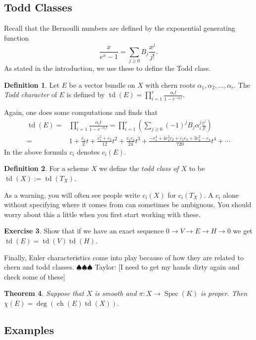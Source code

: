 \documentclass[12pt]{article}
\numberwithin{equation}{section}
\newtheorem{theorem}{Theorem}[subsection]
\theoremstyle{definition}
\newtheorem{definition}[theorem]{Definition}
\newtheorem{exercise}[theorem]{Exercise}
\theoremstyle{remark}
\newcommand{\Spec}{\operatorname{Spec}}
\newcommand{\ch}{\operatorname{ch}}
\newcommand{\td}{\operatorname{td}}
\newcommand{\taylor}[1]{{\color{blue} \sf $\spadesuit\spadesuit\spadesuit$ Taylor: [#1]}}
\begin{document}
\subsection{Todd Classes}
Recall that the Bernoulli numbers are defined by the exponential generating function 
$$\frac{x}{e^x-1} = \sum_{j\geq 0} B_j \frac{x^j}{j!}.$$
As stated in the introduction, we use these to define the Todd class. 
\begin{definition}
	Let $E$ be a vector bundle on $X$ with chern roots $\alpha_1,\alpha_2,\ldots,\alpha_r$.
	The \emph{Todd character} of $E$ is defined by $\td(E) = \prod_{i=1}^r \frac{\alpha_i t}{1 - e^{-\alpha_i t}}$.
\end{definition}
Again, one does some computations and finds that 
\begin{align*}
\td(E) =& \prod_{i=1}^r \frac{\alpha_i t}{1 - e^{-\alpha_it}} = \prod_{i=1}^r \left( \sum_{j\geq 0} (-1)^j B_j  \alpha_i^j \frac{t^j}{j!}\right) \\
=& 1 + \frac{c_1}{2}t + \frac{c_1^2 +c_2}{12}t^2 + \frac{c_1c_2}{24}t^3 + \frac{-c_1^4 + 4 c_1^2 c_2 + c_1c_3 + 3c_2^2 - c_4}{720}t^4 + \cdots 
\end{align*}
In the above formula $c_i$ denotes $c_i(E)$. 
\begin{definition}
	For a scheme $X$ we define the \emph{todd class of $X$} to be $\td(X):= \td(T_X)$.
\end{definition}
As a warning, you will often see people write $c_i(X)$ for $c_i(T_X)$. 
A $c_i$ alone without specifying where it comes from can sometimes be ambiguous. 
You should worry about this a little when you first start working with these.

\begin{exercise}
	Show that if we have an exact sequence $0\to V \to E \to H \to 0$ we get $\td(E) = \td(V)\td(H)$.
\end{exercise}

Finally, Euler characteristics come into play because of how they are related to chern and todd classes. \taylor{I need to get my hands dirty again and check some of these}
\begin{theorem}
	Suppose that $X$ is smooth and $\pi:X\to \Spec(K)$ is proper. 
	Then $ \chi(E) = \deg(\ch(E)\td(X)).$
\end{theorem}

\subsection{Examples}
\end{document}
